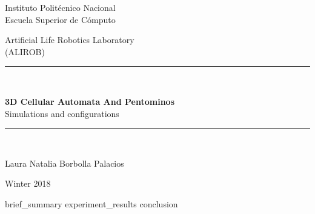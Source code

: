 \documentclass[12pt, letterpaper, oneside]{article}
\title{\Title{}}
\author{\Autor{}}
\date{\today}
\newcommand{\Laboratory}{Artificial Life Robotics Laboratory}
\newcommand{\Acronym}{(ALIROB)}
\newcommand{\Title}{3D Cellular Automata And Pentominos}
\newcommand{\Subtitle}{Simulations and configurations}
\newcommand{\Autor}{Laura Natalia Borbolla Palacios}
\newcommand{\Date}{Winter 2018}
\begin{document}
	\begin{titlepage}
		\begin{center}
			\begin{large}
				Instituto Politécnico Nacional\\
				\vspace*{0.2in}
				Escuela Superior de Cómputo\\
				\vspace*{0.6in}
			\end{large}
			\begin{large}
				\Laboratory{}\\
				\Acronym{}\\
				\vspace*{0.8in}
			\end{large}
			\rule{160mm}{0.1mm}\\
			\vspace*{0.1in}
			\begin{Large}
				\textbf{\Title{}} \\
				\vspace*{0.1in}
				\Subtitle{} \\
			\end{Large}
			\vspace*{0.1in}
			\rule{160mm}{0.1mm}\\
			\begin{large}
				\vspace*{0.8in}
				\Autor{} \\
			\end{large}
			\begin{large}
				\vspace*{0.8in}
				\Date{}\\
			\end{large}
		\end{center}
	\end{titlepage}

	\tableofcontents
	\newpage


  {brief_summary}
  {experiment_results}
  {conclusion}

  \newpage
  \printbibliography[heading=bibintoc]

\end{document}
